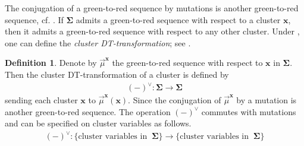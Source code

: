 \documentclass[11pt,reqno]{amsart}
\newcommand{\Qy}[1]{\textcolor{blue!50!cyan}{#1}}
\theoremstyle{plain}
\newtheorem{assumption}[theorem]{Assumption}
\theoremstyle{definition}
\newtheorem{definition}[theorem]{Definition}
\newtheorem{remark}[theorem]{Remark}
\numberwithin{equation}{section}
\newcommand\RR{\mathbb{R}}
\newcommand\<{\langle}
\renewcommand\>{\rangle}
\newcommand{\CEG}{\operatorname{CEG}} %
\newcommand{\bfit}[1]{\textbf{\textit{#1}}}
\newcommand{\ubf}[1]{\underline{\mathbf{#1}}}
\def\seeds{\mathbf{\Sigma}}
\def\xx{\mathbf{x}}%
\def\Cmat{{C}}
\newcommand{\DT}[1]{#1^{\vee}}
\newcommand{\iDT}[1]{#1^{-\vee}}
\begin{document}

The conjugation of a green-to-red sequence by mutations is another green-to-red sequence, cf. \cite[Thm~3.2.1]{Mul}.
If $\seeds$ admits a green-to-red sequence with respect to a cluster $\xx$, then it admits a green-to-red sequence with respect to any other cluster.
Under , one can define the \emph{cluster DT-transformation}; see \cite{Nag}.

\begin{definition}\label{def:DT}
Denote by $\Vec{\mu}^\xx$ the green-to-red sequence with respect to $\xx$ in $\seeds$.
Then the cluster DT-transformation of a cluster is defined by
\begin{gather}
    \DT{(-)}:\seeds\to\seeds
\end{gather}
sending each cluster $\xx$ to $\Vec{\mu}^\xx(\xx)$.
Since the conjugation of $\Vec{\mu}^\xx$ by a mutation is another green-to-red sequence.
The operation $\DT{(-)}$ commutes with mutations and can be specified on cluster variables as follows.
\begin{gather}\label{eq:cDT}
    \DT{(-)}:\{\text{cluster variables in }~\seeds\}\to\{\text{cluster variables in }~\seeds\}
\end{gather}
\end{definition}

\end{document}
